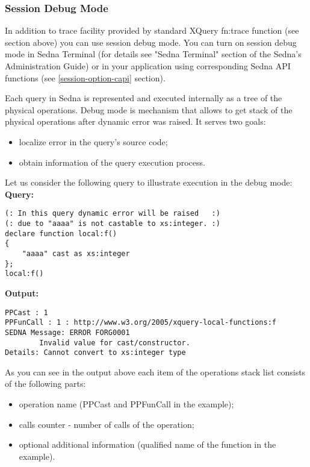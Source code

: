 \documentclass[a4paper,12pt]{article}
\begin{document}
\subsubsection{Session Debug Mode}
\label{session-debug-mode}
In addition to trace facility provided by standard XQuery fn:trace function (see section above) you can use session debug mode. You can turn on session
debug mode in Sedna Terminal (for details see "Sedna Terminal" section of the Sedna's Administration Guide) or in your application using corresponding 
Sedna API functions (see \ref{session-option-capi} section).

Each query in Sedna is represented and executed internally as a tree of the physical operations. Debug mode is mechanism that allows to get stack of the 
physical operations after dynamic error was raised. It serves two goals:

\begin{itemize}
\item localize error in the query's source code;
\item obtain information of the query execution process.
\end{itemize}

Let us consider the following query to illustrate execution in the debug mode:
\newline
\newline
\textbf{Query:}

\begin{verbatim}
(: In this query dynamic error will be raised   :)
(: due to "aaaa" is not castable to xs:integer. :)
declare function local:f()
{
    "aaaa" cast as xs:integer
};
local:f()
\end{verbatim}
\textbf{Output:}

\begin{verbatim}
PPCast : 1
PPFunCall : 1 : http://www.w3.org/2005/xquery-local-functions:f
SEDNA Message: ERROR FORG0001
        Invalid value for cast/constructor.
Details: Cannot convert to xs:integer type
\end{verbatim}

As you can see in the output above each item of the operations stack list consists of the following parts:

\begin{itemize}
\item operation name (PPCast and PPFunCall in the example);
\item calls counter - number of calls of the operation;
\item optional additional information (qualified name of the function in the example).
\end{itemize}
\end{document}
